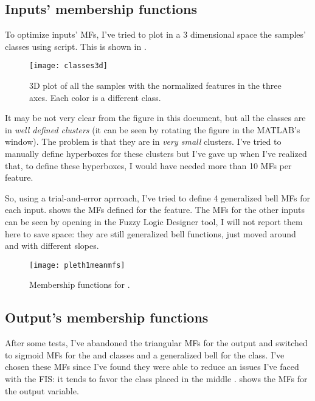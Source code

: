 \subsection{Inputs' membership functions}

To optimize inputs' MFs, I've tried to plot in a 3 dimensional space the
samples' classes using  script. This is shown in
.

\begin{figure}[htbp]
	\centering
	\texttt{[image: classes3d]}
	\caption{3D plot of all the samples with the normalized features in the
	three axes. Each color is a different class.}\label{fig:classes3d}
\end{figure}

It may be not very clear from the figure in this document, but all the classes
are in \emph{well defined clusters} (it can be seen by rotating the figure in
the MATLAB's window). The problem is that they are in \emph{very small}
clusters. I've tried to manually define hyperboxes for these clusters but I've
gave up when I've realized that, to define these hyperboxes, I would have
needed more than 10 MFs per feature.

So, using a trial-and-error aprroach, I've tried to define 4 generalized bell
MFs for each input.  shows the MFs defined for the
 feature. The MFs for the other inputs can be seen by
opening  in the Fuzzy Logic Designer tool, I will not report
them here to save space: they are still generalized bell functions, just moved
around and with different slopes.

\begin{figure}[htbp]
	\centering
	\texttt{[image: pleth1meanmfs]}
	\caption{Membership functions for
	.}\label{fig:pleth1meanmfs}
\end{figure}

\subsection{Output's membership functions}

After some tests, I've abandoned the triangular MFs for the output and
switched to sigmoid MFs for the  and  classes and a
generalized bell for the  class. I've chosen these MFs since I've
found they were able to reduce an issues I've faced with the FIS: it tends to
favor the class placed in the middle .
 shows the MFs for the output variable.

